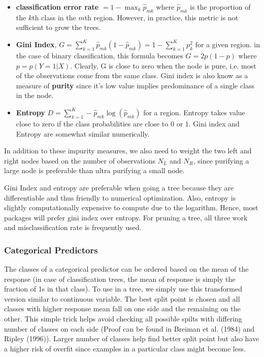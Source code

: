 \documentclass[../statistical_learning_notes.tex]{subfiles}
\begin{document}
    \begin{itemize}
        \item \textbf{classification error rate} $= 1 - \max_{k}\hat{p}_{mk}$ where $\hat{p}_{mk}$ is the proportion of the $k$th class in the $m$th region. However, in practice, this metric is not sufficient to grow the trees.
        \item \textbf{Gini Index}, $G = \sum_{k=1}^{K} \hat{p}_{mk} (1 - \hat{p}_{mk}) = 1 - \sum_{k=1}^{K} p_{k}^{2}$ for a given region. in the case of binary classification, this formula becomes $G = 2p(1-p)$ where $p = p(Y=1|X)$. Clearly, G is close to zero when the node is pure, i.e. most of the observations come from the same class. Gini index is also know as a measure of \textbf{purity} since it's low value implies predominance of a single class in the node.
        \item \textbf{Entropy} $D = \sum_{k=1}^{K} -\hat{p}_{mk} \log(\hat{p}_{mk})$ for a region. Entropy takes value close to zero if the class probabilities are close to $0$ or $1$. Gini index and Entropy are somewhat similar numerically.
    \end{itemize}
    In addition to these impurity measures, we also need to weight the two left and right nodes based on the number of observations $N_{L}$ and $N_{R}$, since purifying a large node is preferable than ultra purifying a small node.\newline

    Gini Index and entropy are preferable when going a tree because they are differentiable and thus friendly to numerical optimization. Also, entropy is slightly computationally expensive to compute due to the logarithm. Hence, most packages will prefer gini index over entropy.\newline
    For pruning a tree, all three work and misclassification rate is frequently used.

    \subsubsection*{Categorical Predictors}
    The classes of a categorical predictor can be ordered based on the mean of the response (in case of classification trees, the mean of response is simply the fraction of 1s in that class). To use in a tree, we simply use this transformed version similar to continuous variable. The best split point is chosen and all classes with higher response mean fall on one side and the remaining on the other. This simple trick helps avoid checking all possible spilts with differing number of classes on each side (Proof can be found in Breiman et al. (1984) and Ripley (1996)). Larger number of classes help find better split point but also have a higher risk of overfit since examples in a particular class might become less.
\end{document}
